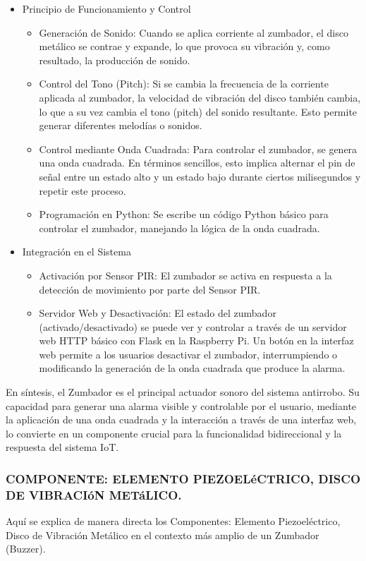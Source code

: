 \documentclass{report}
\begin{document}
\begin{itemize}
    \item Principio de Funcionamiento y Control
    \begin{itemize}
        \item Generación de Sonido: Cuando se aplica corriente al zumbador, el disco metálico se contrae y expande, lo que provoca su vibración y, 
        como resultado, la producción de sonido.
        \item Control del Tono (Pitch): Si se cambia la frecuencia de la corriente aplicada al zumbador, la velocidad de vibración del disco también 
        cambia, lo que a su vez cambia el tono (pitch) del sonido resultante. Esto permite generar diferentes melodías o sonidos.
        \item Control mediante Onda Cuadrada: Para controlar el zumbador, se genera una onda cuadrada. En términos sencillos, esto implica alternar el pin 
        de señal entre un estado alto y un estado bajo durante ciertos milisegundos y repetir este proceso.
        \item Programación en Python: Se escribe un código Python básico para controlar el zumbador, manejando la lógica de la onda cuadrada.
    \end{itemize}

    \item Integración en el Sistema
    \begin{itemize}
        \item Activación por Sensor PIR: El zumbador se activa en respuesta a la detección de movimiento por parte del Sensor PIR.
        \item Servidor Web y Desactivación: El estado del zumbador (activado/desactivado) se puede ver y controlar a través de un 
        servidor web HTTP básico con Flask en la Raspberry Pi. Un botón en la interfaz web permite a los usuarios desactivar el zumbador, 
        interrumpiendo o modificando la generación de la onda cuadrada que produce la alarma.
    \end{itemize}
\end{itemize}

En síntesis, el Zumbador es el principal actuador sonoro del sistema antirrobo. Su capacidad para generar una alarma visible y controlable por el 
usuario, mediante la aplicación de una onda cuadrada y la interacción a través de una interfaz web, lo convierte en un componente crucial para la 
funcionalidad bidireccional y la respuesta del sistema IoT.

\subsubsection{COMPONENTE: ELEMENTO PIEZOELéCTRICO, DISCO DE VIBRACIóN METáLICO.}
Aquí se explica de manera directa los Componentes: Elemento Piezoeléctrico, Disco de Vibración Metálico en el contexto más amplio 
de un Zumbador (Buzzer).
\end{document}

